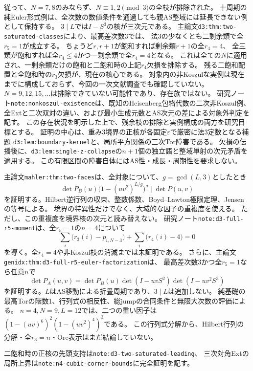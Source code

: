 \documentclass[11pt,a4paper]{ltjsarticle}
\begin{document}
従って、$N=7,8$のみならず、$N\equiv1,2\pmod3$の全枝が排除された。
十周期の純Euler形式例は、全次数の数値条件を通過しても親AS整域には延長できない例として保持する。
$3\mid L$では$I-S^3$の核が三次元である。
主論文\texttt{d3:thm:two-saturated-classes}により、最高差次数3では、
法3の少なくとも二剰余類で全$r_5=1$が成立する。
ちょうど$r,r+1$が飽和すれば剰余類$r+1$の全$r_4=4$、
全三類が飽和すれば全$r_4\le4$かつ一剰余類で全$r_4=4$となる。
これは全ての$N$に適用され、一剰余類だけの飽和と二飽和時の上記$r_4$欠損を排除する。
残る二飽和配置と全飽和時の$r_3$欠損が、現在の核心である。
対象内の非Koszulな実例は現在までに構成しておらず、今回の一次文献調査でも確認していない。
$N=9,12,15,\ldots$は排除できていない可能性であり、存在族ではない。
研究ノート\texttt{note:nonkoszul-existence}は、既知のHeisenberg包絡代数の二次非Koszul例、
全Extと二次双対の違い、および最小生成元数とAS次元の差による対象外判定を記す。
この存在状況を明示した上で、残余枝の排除と実例構成の両方を研究目標とする。
証明の中心は、重み3境界の正核が各固定$\varepsilon$で厳密に法3定数となる補題
\texttt{d3:lem:boundary-kernel}と、局所平方関係の三次Tor障害である。
欠損の伝播後に、\texttt{d3:lem:single-z-collapse}の$n+1$個の独立語と整域単射の次元矛盾を適用する。
この有限区間の障害自体にはAS性・成長・周期性を要求しない。

主論文\texttt{mahler:thm:two-faces}は、全対象について、$g=\gcd(L,3)$としたとき
\[
 \det P_B(u)\bigl(1-(uv^2)^{L/g}\bigr)^g\mid\det P(u,v)
\]
を証明する。Hilbert逆行列の収束、整数係数、Boyd--Lawton極限定理、Jensenの等号による。
境界の特異性だけでなく、大域的な因子の重複度を使える。
ただし、この重複度を境界核の次元と読み替えない。
研究ノート\texttt{note:d3-full-r5-moment}は、全$r_5=1$の$n=4$について
\[
 \sum_i\bigl(r_3(i)-p_{i,N-3}\bigr)+\sum_i\bigl(r_4(i)-4\bigr)=0
\]
を導く。全$r_4=4$や非Koszul枝の消滅までは未証明である。
さらに、主論文\texttt{genidx:thm:d3-full-r5-euler-factorization}は、
最高差次数3かつ全$r_5=1$なら任意$n$で
\[
 \det P_A(u,v)=\det P_B(u)\det(I-uvS^2)\det(I-uv^2S^3)
\]
を証明する。$L$はAS移動による折畳周期であり、$3\mid L$は追加しない。
純基礎の最高Torの階数1、行列式の相反性、総jumpの合同条件と無限大次数の評価による。
$n=4,N=9,L=12$では、二つの重い因子は$(1-(uv)^6)^2(1-(uv^2)^4)^3$である。
この行列式分解から、Hilbert行列の分解・全$r_3=n$・Ore表示はまだ結論していない。

二飽和時の正核の先頭支持は\texttt{note:d3-two-saturated-leading}、
三次対角Extの局所上界は\texttt{note:n4-cubic-corner-bounds}に完全証明を記す。
\end{document}
